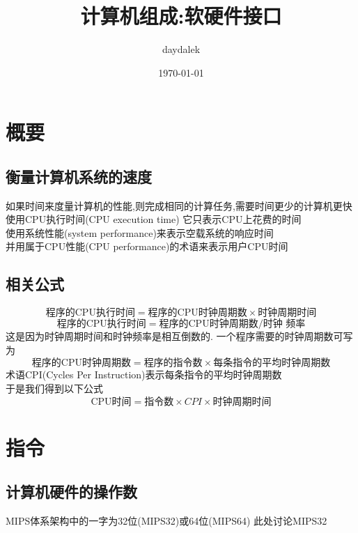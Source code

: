 \documentclass{ctexart}
\begin{document}
\title{计算机组成:软硬件接口}
\author{daydalek}
\date{\today}
\maketitle
\section{概要}
\subsection{衡量计算机系统的速度}
如果时间来度量计算机的性能,则完成相同的计算任务,需要时间更少的计算机更快\\
使用CPU执行时间(CPU execution time) 它只表示CPU上花费的时间\\
使用系统性能(system performance)来表示空载系统的响应时间\\
并用属于CPU性能(CPU performance)的术语来表示用户CPU时间\\
\subsection{相关公式}
\begin{equation}
\mbox{程序的CPU执行时间}=\mbox{程序的CPU时钟周期数}\times\mbox{时钟周期时间}
\end{equation}
\begin{equation}
\mbox{程序的CPU执行时间}=\mbox{程序的CPU时钟周期数}/\mbox{时钟 频率}
\end{equation}
这是因为时钟周期时间和时钟频率是相互倒数的.
一个程序需要的时钟周期数可写为
\begin{equation}
\mbox{程序的CPU时钟周期数}=\mbox{程序的指令数}\times\mbox{每条指令的平均时钟周期数}
\end{equation}
术语CPI(Cycles Per Instruction)表示每条指令的平均时钟周期数\\
于是我们得到以下公式
\begin{equation}
\mbox{CPU时间}=\mbox{指令数}\times CPI \times\mbox{时钟周期时间}
\end{equation}

\section{指令}
\subsection{计算机硬件的操作数}
MIPS体系架构中的一字为32位(MIPS32)或64位(MIPS64) 此处讨论MIPS32\\
\end{document}
